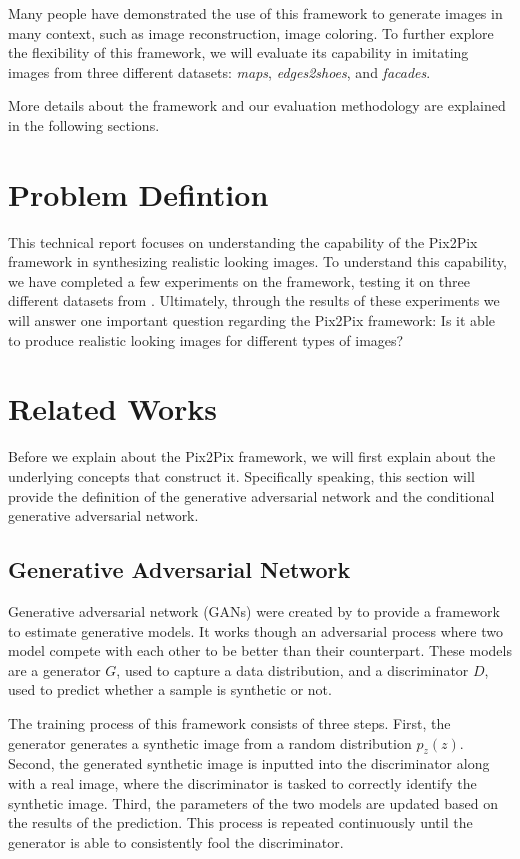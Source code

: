 \documentclass[peerreview]{IEEEtran}
\begin{document}
Many people have demonstrated the use of this framework to generate images in many context, such as image reconstruction, image coloring. To further explore the flexibility of this framework, we will evaluate its capability in imitating images from three different datasets: \textit{maps}, \textit{edges2shoes}, and \textit{facades}. 

More details about the framework and our evaluation methodology are explained in the following sections.

\section{Problem Defintion}
This technical report focuses on understanding the capability of the Pix2Pix framework in synthesizing realistic looking images. To understand this capability, we have completed a few experiments on the framework, testing it on three different datasets from \cite{berkeley2017}. Ultimately, through the results of these experiments we will answer one important question regarding the Pix2Pix framework: Is it able to produce realistic looking images for different types of images?

\section{Related Works}
Before we explain about the Pix2Pix framework, we will first explain about the underlying concepts that construct it. Specifically speaking, this section will provide the definition of the generative adversarial network and the conditional generative adversarial network.

\subsection{Generative Adversarial Network}
Generative adversarial network (GANs) were created by \cite{goodfellow2014generative} to provide a framework to estimate generative models. It works though an adversarial process where two model compete with each other to be better than their counterpart. These models are a generator $G$, used to capture a data distribution, and a discriminator $D$, used to predict whether a sample is synthetic or not.

The training process of this framework consists of three steps. First, the generator generates a synthetic image from a random distribution $p_z(z)$. Second, the generated synthetic image is inputted into the discriminator along with a real image, where the discriminator is tasked to correctly identify the synthetic image. Third, the parameters of the two models are updated based on the results of the prediction. This process is repeated continuously until the generator is able to consistently fool the discriminator.
\end{document}
